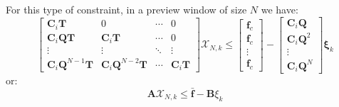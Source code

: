 \-For this type of constraint, in a preview window of size $N$ we have\-: \[ \left[\begin{array}{cccc} \mathbf{C}_i\mathbf{T} & 0 & \cdots & 0 \\ \mathbf{C}_i\mathbf{Q}\mathbf{T} & \mathbf{C}_i\mathbf{T} & \cdots & 0 \\ \vdots & \vdots & \ddots & \vdots \\ \mathbf{C}_i\mathbf{Q}^{N-1}\mathbf{T} & \mathbf{C}_i\mathbf{Q}^{N-2}\mathbf{T} & \cdots & \mathbf{C}_i\mathbf{T} \end{array}\right] \mathbf{\mathcal{X}}_{N,k} \leq \left[\begin{array}{c} \mathbf{f}_c\\ \mathbf{f}_c\\ \vdots\\ \mathbf{f}_c \end{array}\right] - \left[\begin{array}{c} \mathbf{C}_i\mathbf{Q}\\ \mathbf{C}_i\mathbf{Q}^2\\ \vdots\\ \mathbf{C}_i\mathbf{Q}^N \end{array}\right] \mathbf{\xi}_k \] or\-: \[ \mathbf{A} \mathbf{\mathcal{X}}_{N,k} \leq \bar{\mathbf{f}} - \mathbf{B}\xi_k \] 

